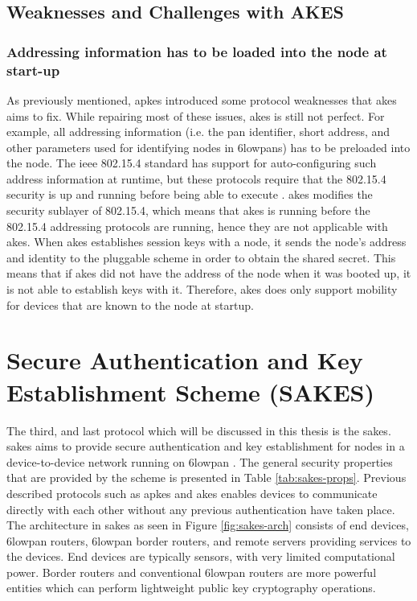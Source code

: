 \subsection{Weaknesses and Challenges with AKES}

\subsubsection{Addressing information has to be loaded into the node at start-up}

As previously mentioned, \gls{apkes} introduced some protocol weaknesses that \gls{akes} aims to fix. While repairing most of these issues, \gls{akes} is still not perfect. For example, all addressing information (i.e. the \gls{pan} identifier, short address, and other parameters used for identifying nodes in \gls{6lowpan}s) has to be preloaded into the node. The \gls{ieee} 802.15.4 standard has support for auto-configuring such address information at runtime, but these protocols require that the 802.15.4 security is up and running before being able to execute \cite{krentz2015handling}. \gls{akes} modifies the security sublayer of 802.15.4, which means that \gls{akes} is running before the 802.15.4 addressing protocols are running, hence they are not applicable with \gls{akes}. When \gls{akes} establishes session keys with a node, it sends the node's address and identity to the pluggable scheme in order to obtain the shared secret. This means that if \gls{akes} did not have the address of the node when it was booted up, it is not able to establish keys with it. Therefore, \gls{akes} does only support mobility for devices that are known to the node at startup.
 

\section{Secure Authentication and Key Establishment Scheme (SAKES)}
\label{sec:sakes}

The third, and last protocol which will be discussed in this thesis is the \gls{sakes}. \gls{sakes} aims to provide secure authentication and key establishment for nodes in a device-to-device network running on \gls{6lowpan} \cite{hussen2013sakes}. The general security properties that are provided by the scheme is presented in Table \ref{tab:sakes-props}. Previous described protocols such as \gls{apkes} and \gls{akes} enables devices to communicate directly with each other without any previous authentication have taken place. The architecture in \gls{sakes} as seen in Figure \ref{fig:sakes-arch} consists of end devices, \gls{6lowpan} routers, \gls{6lowpan} border routers, and remote servers providing services to the devices. End devices are typically sensors, with very limited computational power. Border routers and conventional \gls{6lowpan} routers are more powerful entities which can perform lightweight public key cryptography operations.

